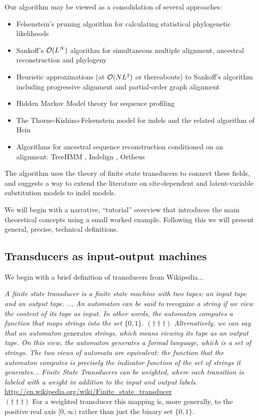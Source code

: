 \documentclass{article}
\begin{document}
Our algorithm may be viewed as a consolidation of several approaches:
\begin{itemize}
\item Felsenstein's pruning algorithm for calculating statistical phylogenetic likelihoods \cite{Felsenstein81}
\item Sankoff's ${\cal O}(L^N)$ algorithm for simultaneous multiple alignment, ancestral reconstruction and phylogeny \cite{SankoffCedergren83}
\item Heuristic approximations (at ${\cal O}(NL^2)$ or thereabouts) to Sankoff's algorithm including progressive alignment \cite{HigginsSharp89} and partial-order graph alignment \cite{LeeGrassoSharlow2002}
\item Hidden Markov Model theory for sequence profiling \cite{Durbin98}
\item The Thorne-Kishino-Felsenstein model for indels \cite{ThorneEtal91}
 and the related algorithm of Hein \cite{Hein2001}
\item Algorithms for ancestral sequence reconstruction conditioned on an alignment:
 TreeHMM \cite{DialloEtAl2007}, Indelign \cite{KimSinha2007}, Ortheus \cite{PatenEtAl2008}
\end{itemize}

The algorithm uses the theory of finite state transducers to connect these fields,
and suggests a way to extend the literature on
site-dependent and latent-variable substitution models \cite{Yang94,Bruno96,YangEtAl2000,HolmesRubin2002b}
to indel models.

We will begin with a narrative, ``tutorial'' overview that introduces the main theoretical concepts
using a small worked example.
Following this we will present general, precise, technical definitions.

\subsection{Transducers as input-output machines}

We begin with a brief definition of transducers from Wikipedia...

{\em A finite state transducer is a finite state machine with two tapes: an input tape and an output tape. ... An automaton can be said to } recognize {\em a string if we view the content of its tape as input. In other words, the automaton computes a function that maps strings into the set $\{0,1\}$. $(\dagger\dagger\dagger)$ Alternatively, we can say that an automaton } generates {\em strings, which means viewing its tape as an output tape. On this view, the automaton generates a formal language, which is a set of strings. The two views of automata are equivalent: the function that the automaton computes is precisely the indicator function of the set of strings it generates... Finite State Transducers can be weighted, where each transition is labeled with a weight in addition to the input and output labels. }
\url{http://en.wikipedia.org/wiki/Finite_state_transducer}
\\
$(\dagger\dagger\dagger)$ For a weighted transducer this mapping is,
more generally, to the positive real axis $[0,\infty)$
rather than just the binary set $\{0,1\}$.
\end{document}
